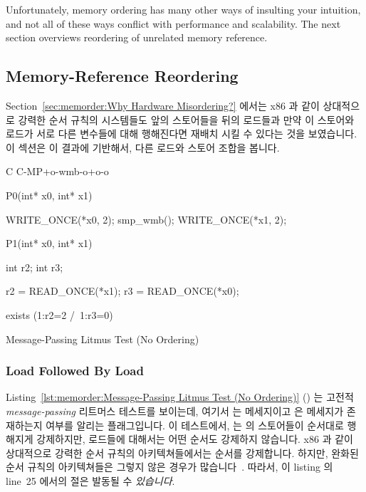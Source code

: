 Unfortunately, memory ordering has many other ways of insulting your
intuition, and not all of these ways conflict with performance and
scalability.
The next section overviews reordering of unrelated memory reference.
\fi

\subsection{Memory-Reference Reordering}
\label{sec:memorder:Memory-Reference Reordering}

Section~\ref{sec:memorder:Why Hardware Misordering?}
에서는 x86 과 같이 상대적으로 강력한 순서 규칙의 시스템들도 앞의 스토어들을
뒤의 로드들과 만약 이 스토어와 로드가 서로 다른 변수들에 대해 행해진다면 재배치
시킬 수 있다는 것을 보였습니다.
이 섹션은 이 결과에 기반해서, 다른 로드와 스토어 조합을 봅니다.

\begin{listing}[tbp]
{ \scriptsize
\begin{verbbox}[\LstLineNo]
C C-MP+o-wmb-o+o-o

{
}


P0(int* x0, int* x1) {

  WRITE_ONCE(*x0, 2);
  smp_wmb();
  WRITE_ONCE(*x1, 2);

}

P1(int* x0, int* x1) {

  int r2;
  int r3;

  r2 = READ_ONCE(*x1);
  r3 = READ_ONCE(*x0);

}

exists (1:r2=2 /\ 1:r3=0)
\end{verbbox}
}
\centering
\theverbbox
\caption{Message-Passing Litmus Test (No Ordering)}
\label{lst:memorder:Message-Passing Litmus Test (No Ordering)}
\end{listing}

\subsubsection{Load Followed By Load}
\label{sec:memorder:Load Followed By Load}

Listing~\ref{lst:memorder:Message-Passing Litmus Test (No Ordering)}
()
는 고전적 \emph{message-passing} 리트머스 테스트를 보이는데, 여기서  는
메세지이고  은 메세지가 존재하는지 여부를 알리는 플래그입니다.
이 테스트에서,  는  의 스토어들이 순서대로 행해지게
강제하지만, 로드들에 대해서는 어떤 순서도 강제하지 않습니다.
x86 과 같이 상대적으로 강력한 순서 규칙의 아키텍쳐들에서는 순서를 강제합니다.
하지만, 완화된 순서 규칙의 아키텍쳐들은 그렇지 않은 경우가
많습니다~\cite{JadeAlglave2011ppcmem}.
따라서, 이 listing 의 line~25 에서의  절은 발동될 수
\emph{있습니다}.
\iffalse

